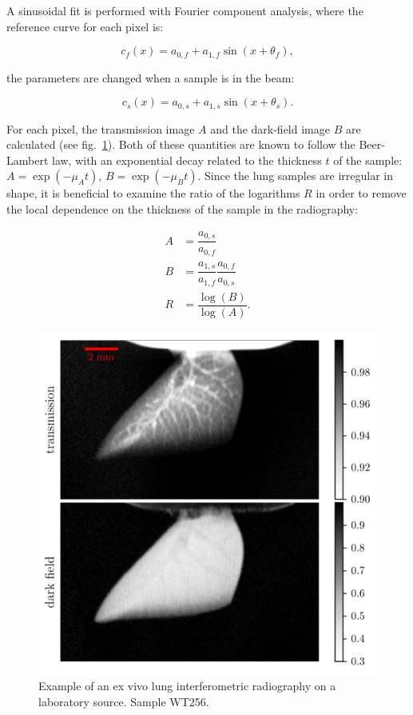 \documentclass[preprint,12pt]{elsarticle}
\begin{document}
A sinusoidal fit is performed with Fourier component analysis, where the
reference curve for each pixel is:

\begin{equation}
    c_f(x) = a_{0,f} + a_{1,f} \sin(x + \theta_{f}),
    \label{eqn:flat}
\end{equation}

the parameters are changed when a sample is in the beam:

\begin{equation}
    c_s(x) = a_{0,s} + a_{1,s} \sin(x + \theta_{s}).
    \label{eqn:sample}
\end{equation}

For each pixel, the transmission image $A$ and the
dark-field image $B$ are calculated (see fig.~\ref{590406}). Both of these
quantities are known to follow the Beer-Lambert law, with an exponential
decay related to the thickness $t$ of the sample: $A = \exp(-\mu_A t)$, $B =
\exp(-\mu_B t)$. Since the lung samples are irregular in shape, it is
beneficial to examine the ratio of the logarithms $R$ in
order to remove the local dependence on the thickness of the sample in the
radiography:

\begin{align*}
    A &= \dfrac{a_{0,s}}{a_{0,f}}\\
    B &= \dfrac{a_{1,s}}{a_{1,f}}\dfrac{a_{0,f}}{a_{0,s}}\\
    R &= \dfrac{\log(B)}{\log(A)}.
    \label{eqn:definitions}
\end{align*}
\begin{figure}[h!]
\begin{center}
\includegraphics[width=0.70\columnwidth]{figures/KO373_LL_smoke/WT256_LL_smoke}
\caption{{Example of an ex vivo lung interferometric radiography on a laboratory
source. Sample WT256.
{\label{590406}}%
}}
\end{center}
\end{figure}
\end{document}
